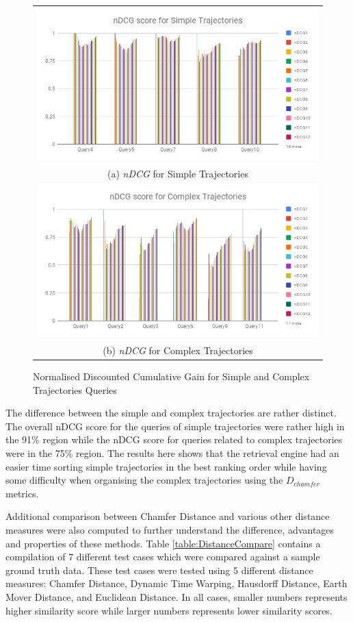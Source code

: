 \begin{figure}[htb!]
  \centering
\begin{tabular}{c}
 \includegraphics[width=0.9\linewidth]{image/retrievalTwo/ndcgSimple.png}\\
 (a) \textit{nDCG} for Simple Trajectories \\
 \includegraphics[width=0.9\linewidth]{image/retrievalTwo/ndcgComplex.png} \\
 (b) \textit{nDCG} for Complex Trajectories
\end{tabular}
\caption{Normalised Discounted Cumulative Gain for Simple and Complex Trajectories Queries} \label{fig:versionTwoNDCG}
\end{figure}

The difference between the simple and complex trajectories are rather distinct. The overall nDCG score for the queries of simple trajectories were rather high in the 91\% region while the nDCG score for queries related to complex trajectories were in the 75\% region. The results here shows that the retrieval engine had an easier time sorting simple trajectories in the best ranking order while having some difficulty when organising the complex trajectories using the $D_{chamfer}$ metrics.

Additional comparison between Chamfer Distance and various other distance measures were also computed to further understand the difference, advantages and properties of these methods. Table \ref{table:DistanceCompare} contains a compilation of 7 different test cases which were compared against a sample ground truth data. These test cases were tested using 5 different distance measures: Chamfer Distance, Dynamic Time Warping, Hausdorff Distance, Earth Mover Distance, and Euclidean Distance.
In all cases, smaller numbers represents higher similarity score while larger numbers represents lower similarity scores.


